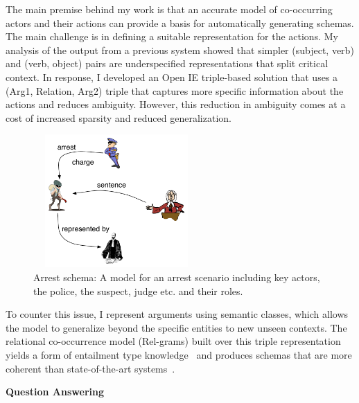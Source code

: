 \documentclass[a4paper,11pt,onecolumn]{article}
\begin{document}
The main premise behind my work is that an accurate model of co-occurring actors and their actions can provide a basis for automatically generating schemas. The main challenge is in defining a suitable representation for the actions. My analysis of the output from a previous system showed that simpler (subject, verb) and (verb, object) pairs are underspecified representations that split critical context. In response, I developed an Open IE triple-based solution that uses a (Arg1, Relation, Arg2) triple that captures more specific information about the actions and reduces ambiguity. However, this reduction in ambiguity comes at a cost of increased sparsity and reduced generalization. 
\begin{figure}
	\vspace{-2ex}
	\begin{center}
	\includegraphics[width=2.5in,height=2in]{figures/arrest-scenario} 	
	\vspace{-2ex}
	\caption{\label{fig:arrest} {\small Arrest schema: A model for an arrest scenario including key actors, the police, the suspect, judge etc. and their roles.}}
	\vspace{-2ex}
	\end{center}
\end{figure}
To counter this issue, I represent arguments using semantic classes, which allows the model to generalize beyond the specific entities to new unseen contexts. The relational co-occurrence model (Rel-grams) built over this triple representation yields a form of entailment type knowledge~\cite{balasubramanian-akbc12} and produces schemas that are more coherent than state-of-the-art systems~\cite{balasubramanian-emnlp13}.

{\bf Question Answering}
\end{document}
